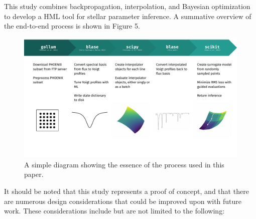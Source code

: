 \documentclass[twocolumn]{aastex631}
\begin{document}
This study combines backpropagation, interpolation, and Bayesian optimization
to develop a HML tool for stellar parameter inference. A summative overview 
of the end-to-end process is shown in Figure 5.
\begin{figure}
    \centering
    \includegraphics[width=\textwidth]{figure5}
    \caption{A simple diagram showing the essence of the process used in 
    this paper.}
\end{figure}
It should be noted that this study represents a proof of concept, and that 
there are numerous design considerations that could be improved upon with 
future work. These considerations include but are not limited to the 
following:
\end{document}
